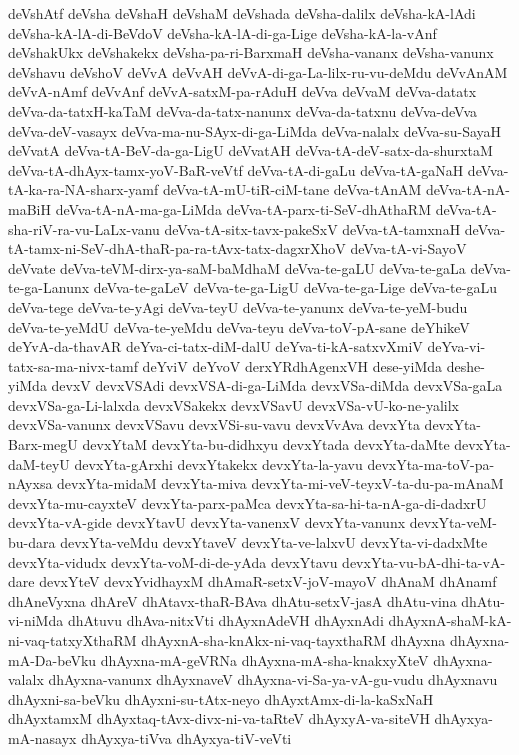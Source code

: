{deVshAtf
deVsha
deVshaH
deVshaM
deVshada
deVsha-dalilx
deVsha-kA-lAdi
deVsha-kA-lA-di-BeVdoV
deVsha-kA-lA-di-ga-Lige
deVsha-kA-la-vAnf
deVshakUkx
deVshakekx
deVsha-pa-ri-BarxmaH
deVsha-vananx
deVsha-vanunx
deVshavu
deVshoV
deVvA
deVvAH
deVvA-di-ga-La-lilx-ru-vu-deMdu
deVvAnAM
deVvA-nAmf
deVvAnf
deVvA-satxM-pa-rAduH
deVva
deVvaM
deVva-datatx
deVva-da-tatxH-kaTaM
deVva-da-tatx-nanunx
deVva-da-tatxnu
deVva-deVva
deVva-deV-vasayx
deVva-ma-nu-SAyx-di-ga-LiMda
deVva-nalalx
deVva-su-SayaH
deVvatA
deVva-tA-BeV-da-ga-LigU
deVvatAH
deVva-tA-deV-satx-da-shurxtaM
deVva-tA-dhAyx-tamx-yoV-BaR-veVtf
deVva-tA-di-gaLu
deVva-tA-gaNaH
deVva-tA-ka-ra-NA-sharx-yamf
deVva-tA-mU-tiR-ciM-tane
deVva-tAnAM
deVva-tA-nA-maBiH
deVva-tA-nA-ma-ga-LiMda
deVva-tA-parx-ti-SeV-dhAthaRM
deVva-tA-sha-riV-ra-vu-LaLx-vanu
deVva-tA-sitx-tavx-pakeSxV
deVva-tA-tamxnaH
deVva-tA-tamx-ni-SeV-dhA-thaR-pa-ra-tAvx-tatx-dagxrXhoV
deVva-tA-vi-SayoV
deVvate
deVva-teVM-dirx-ya-saM-baMdhaM
deVva-te-gaLU
deVva-te-gaLa
deVva-te-ga-Lanunx
deVva-te-gaLeV
deVva-te-ga-LigU
deVva-te-ga-Lige
deVva-te-gaLu
deVva-tege
deVva-te-yAgi
deVva-teyU
deVva-te-yanunx
deVva-te-yeM-budu
deVva-te-yeMdU
deVva-te-yeMdu
deVva-teyu
deVva-toV-pA-sane
deYhikeV
deYvA-da-thavAR
deYva-ci-tatx-diM-dalU
deYva-ti-kA-satxvXmiV
deYva-vi-tatx-sa-ma-nivx-tamf
deYviV
deYvoV
derxYRdhAgenxVH
dese-yiMda
deshe-yiMda
devxV
devxVSAdi
devxVSA-di-ga-LiMda
devxVSa-diMda
devxVSa-gaLa
devxVSa-ga-Li-lalxda
devxVSakekx
devxVSavU
devxVSa-vU-ko-ne-yalilx
devxVSa-vanunx
devxVSavu
devxVSi-su-vavu
devxVvAva
devxYta
devxYta-Barx-megU
devxYtaM
devxYta-bu-didhxyu
devxYtada
devxYta-daMte
devxYta-daM-teyU
devxYta-gArxhi
devxYtakekx
devxYta-la-yavu
devxYta-ma-toV-pa-nAyxsa
devxYta-midaM
devxYta-miva
devxYta-mi-veV-teyxV-ta-du-pa-mAnaM
devxYta-mu-cayxteV
devxYta-parx-paMca
devxYta-sa-hi-ta-nA-ga-di-dadxrU
devxYta-vA-gide
devxYtavU
devxYta-vanenxV
devxYta-vanunx
devxYta-veM-bu-dara
devxYta-veMdu
devxYtaveV
devxYta-ve-lalxvU
devxYta-vi-dadxMte
devxYta-vidudx
devxYta-voM-di-de-yAda
devxYtavu
devxYta-vu-bA-dhi-ta-vA-dare
devxYteV
devxYvidhayxM
dhAmaR-setxV-joV-mayoV
dhAnaM
dhAnamf
dhAneVyxna
dhAreV
dhAtavx-thaR-BAva
dhAtu-setxV-jasA
dhAtu-vina
dhAtu-vi-niMda
dhAtuvu
dhAva-nitxVti
dhAyxnAdeVH
dhAyxnAdi
dhAyxnA-shaM-kA-ni-vaq-tatxyXthaRM
dhAyxnA-sha-knAkx-ni-vaq-tayxthaRM
dhAyxna
dhAyxna-mA-Da-beVku
dhAyxna-mA-geVRNa
dhAyxna-mA-sha-knakxyXteV
dhAyxna-valalx
dhAyxna-vanunx
dhAyxnaveV
dhAyxna-vi-Sa-ya-vA-gu-vudu
dhAyxnavu
dhAyxni-sa-beVku
dhAyxni-su-tAtx-neyo
dhAyxtAmx-di-la-kaSxNaH
dhAyxtamxM
dhAyxtaq-tAvx-divx-ni-va-taRteV
dhAyxyA-va-siteVH
dhAyxya-mA-nasayx
dhAyxya-tiVva
dhAyxya-tiV-veVti
}
